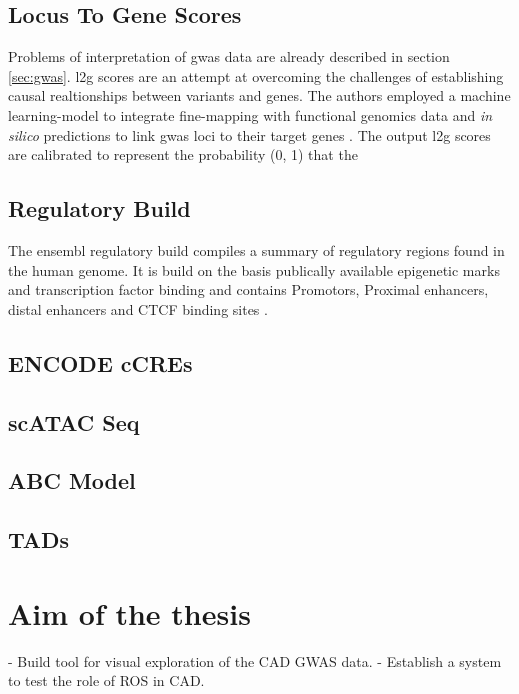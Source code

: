     \subsection{Locus To Gene Scores}
    Problems of interpretation of \ac{gwas} data are already described in section \ref{sec:gwas}. \ac{l2g} scores are an attempt at overcoming the challenges of establishing causal realtionships between variants and genes. The authors employed a machine learning-model to integrate fine-mapping with functional genomics data and \textit{in silico} predictions to link \ac{gwas} loci to their target genes \cite{mountjoyOpenApproachSystematically2021}. The output \ac{l2g} scores are calibrated to represent the probability (0, 1) that the

    \subsection{Regulatory Build}
    The ensembl regulatory build compiles a summary of regulatory regions found in the human genome. It is build on the basis publically available epigenetic marks and transcription factor binding and contains Promotors, Proximal enhancers, distal enhancers and CTCF binding sites \cite{zerbinoEnsemblRegulatoryBuild2015}.

    \subsection{ENCODE cCREs}
    \cite{SCREENSearchCandidate, mooreExpandedEncyclopaediasDNA2020}

    \subsection{scATAC Seq}
    \cite{buenrostroTranspositionNativeChromatin2013} %
    \cite{turnerCellspecificChromatinLandscape2021a} %
    \cite{zhangSinglecellAtlasChromatin2021} %

    \subsection{ABC Model}
    \cite{fulcoActivitybycontactModelEnhancer2019a, nasserGenomewideEnhancerMaps2021a}

    \subsection{TADs}
    \cite{wang3DGenomeBrowser2018}

\section{Aim of the thesis}
\label{sec:Aim}
- Build tool for visual exploration of the CAD GWAS data.
- Establish a system to test the role of ROS in CAD.
